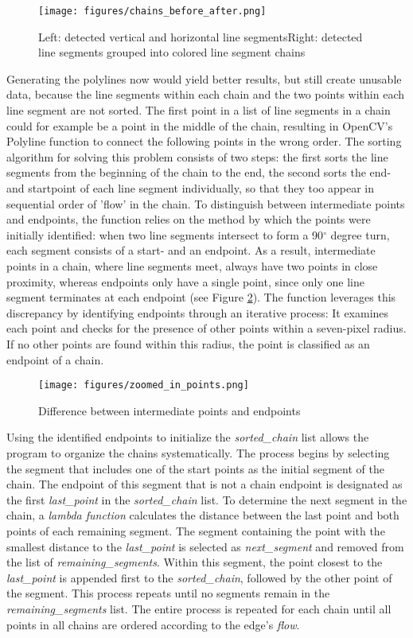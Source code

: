 \begin{figure}[h]
    \centering
    \texttt{[image: figures/chains\_before\_after.png]}
    \caption{Left: detected vertical and horizontal line segmentsRight: detected line segments grouped into colored line segment chains}
    \label{fig_chains_before_after}
\end{figure}
Generating the polylines now would yield better results, but still create unusable data, because the line segments within each chain and the two points within each line segment are not sorted. The first point in a list of line segments in a chain could for example be a point in the middle of the chain, resulting in OpenCV's Polyline function to connect the following points in the wrong order.
The sorting algorithm for solving this problem consists of two steps: the first sorts the line segments from the beginning of the chain to the end, the second sorts the end- and startpoint of each line segment individually, so that they too appear in sequential order of 'flow' in the chain.
To distinguish between intermediate points and endpoints, the function relies on the method by which the points were initially identified: when two line segments intersect to form a 90$^{\circ}$ degree turn, each segment consists of a start- and an endpoint. As a result, intermediate points in a chain, where line segments meet, always have two points in close proximity, whereas endpoints only have a single point, since only one line segment terminates at each endpoint (see Figure \ref{fig_point_zoom}).
The function leverages this discrepancy by identifying endpoints through an iterative process: It examines each point and checks for the presence of other points within a seven-pixel radius. If no other points are found within this radius, the point is classified as an endpoint of a chain.
\begin{figure}
    \centering
    \texttt{[image: figures/zoomed\_in\_points.png]}
    \caption{Difference between intermediate points and endpoints}
    \label{fig_point_zoom}
\end{figure}
Using the identified endpoints to initialize the \textit{sorted\_chain} list allows the program to organize the chains systematically. The process begins by selecting the segment that includes one of the start points as the initial segment of the chain. The endpoint of this segment that is not a chain endpoint is designated as the first \textit{last\_point} in the \textit{sorted\_chain} list. To determine the next segment in the chain, a \textit{lambda function} calculates the distance between the last point and both points of each remaining segment. The segment containing the point with the smallest distance to the \textit{last\_point} is selected as \textit{next\_segment} and removed from the list of \textit{remaining\_segments}. Within this segment, the point closest to the \textit{last\_point} is appended first to the \textit{sorted\_chain}, followed by the other point of the segment. This process repeats until no segments remain in the \textit{remaining\_segments} list. The entire process is repeated for each chain until all points in all chains are ordered according to the edge's \textit{flow}.

